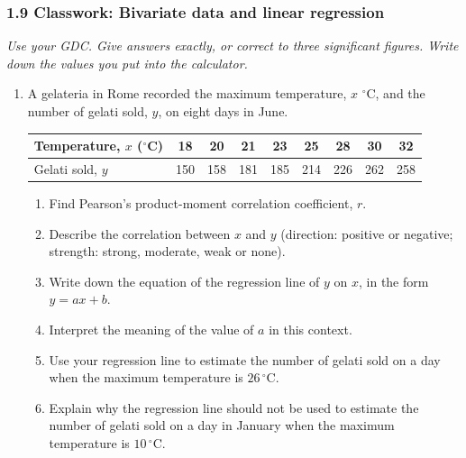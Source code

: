 \documentclass[12pt, twoside]{article}
\begin{document}
\subsubsection*{1.9 Classwork: Bivariate data and linear regression}

\emph{Use your GDC. Give answers exactly, or correct to three significant
figures. Write down the values you put into the calculator.}

\begin{enumerate}[itemsep=0.15cm]

\item[1.]

A gelateria in Rome recorded the maximum temperature, $x$ $^{\circ}$C, and
the number of gelati sold, $y$, on eight days in June.

\begin{center}
\setlength{\tabcolsep}{7pt}\renewcommand{\arraystretch}{1.2}
\begin{tabular}{|l|c|c|c|c|c|c|c|c|}
\hline
Temperature, $x$ ($^{\circ}$C) & 18 & 20 & 21 & 23 & 25 & 28 & 30 & 32 \\
\hline
Gelati sold, $y$ & 150 & 158 & 181 & 185 & 214 & 226 & 262 & 258 \\
\hline
\end{tabular}
\end{center}

\begin{enumerate}[itemsep=0.1cm]
  \item Find Pearson's product-moment correlation coefficient, $r$.
  \item Describe the correlation between $x$ and $y$ (direction: positive
  or negative; strength: strong, moderate, weak or none).
  \item Write down the equation of the regression line of $y$ on $x$, in
  the form $y = ax + b$.
  \item Interpret the meaning of the value of $a$ in this context.
  \item Use your regression line to estimate the number of gelati sold on
  a day when the maximum temperature is $26\,^{\circ}$C.
  \item Explain why the regression line should not be used to estimate the
  number of gelati sold on a day in January when the maximum temperature
  is $10\,^{\circ}$C.
\end{enumerate}


\end{enumerate}
\end{document}
